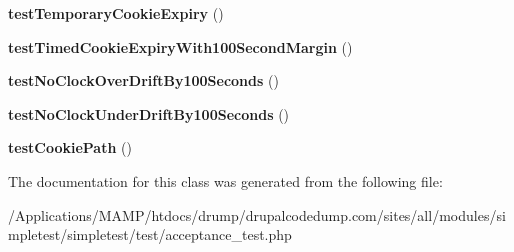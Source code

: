 \begin{DoxyCompactItemize}
\item 
\hypertarget{class_test_of_live_cookies_aa705f59a0f6c0e77967ef1293bd71210}{
{\bfseries testTemporaryCookieExpiry} ()}
\label{class_test_of_live_cookies_aa705f59a0f6c0e77967ef1293bd71210}

\item 
\hypertarget{class_test_of_live_cookies_a29f69c02a09866e5d039a90c2a6ab7af}{
{\bfseries testTimedCookieExpiryWith100SecondMargin} ()}
\label{class_test_of_live_cookies_a29f69c02a09866e5d039a90c2a6ab7af}

\item 
\hypertarget{class_test_of_live_cookies_a2cac1862cb13ed4e5cf45e739fa714d4}{
{\bfseries testNoClockOverDriftBy100Seconds} ()}
\label{class_test_of_live_cookies_a2cac1862cb13ed4e5cf45e739fa714d4}

\item 
\hypertarget{class_test_of_live_cookies_a00af21589765fa4f9325a4e97bfd1606}{
{\bfseries testNoClockUnderDriftBy100Seconds} ()}
\label{class_test_of_live_cookies_a00af21589765fa4f9325a4e97bfd1606}

\item 
\hypertarget{class_test_of_live_cookies_a6e7558facec840f5f5b212bbdad0e33b}{
{\bfseries testCookiePath} ()}
\label{class_test_of_live_cookies_a6e7558facec840f5f5b212bbdad0e33b}

\end{DoxyCompactItemize}


The documentation for this class was generated from the following file:\begin{DoxyCompactItemize}
\item 
/Applications/MAMP/htdocs/drump/drupalcodedump.com/sites/all/modules/simpletest/simpletest/test/acceptance\_\-test.php\end{DoxyCompactItemize}
